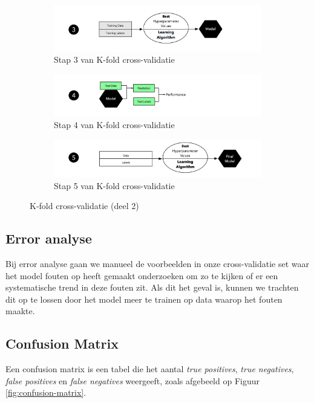 \newpage
\begin{figure}[h]\ContinuedFloat
	\centering
	\begin{subfigure}{.70\textwidth}
		\centering
		\includegraphics[width=\linewidth]{images/23-kfold-step-3.png}
		\caption{Stap 3 van K-fold cross-validatie}
		\label{fig:kfold-step-3}
	\end{subfigure}
	\begin{subfigure}{.70\textwidth}
		\centering
		\includegraphics[width=\linewidth]{images/24-kfold-step-4.png}
		\caption{Stap 4 van K-fold cross-validatie}
		\label{fig:kfold-step-4}
	\end{subfigure}
	\begin{subfigure}{.70\textwidth}
		\centering
		\includegraphics[width=\linewidth]{images/25-kfold-step-5.png}
		\caption{Stap 5 van K-fold cross-validatie}
		\label{fig:kfold-step-5}
	\end{subfigure}
	\caption{K-fold cross-validatie (deel 2)}
\end{figure}

\subsection{Error analyse}

Bij error analyse gaan we manueel de voorbeelden in onze cross-validatie set waar het model fouten op heeft gemaakt onderzoeken om zo te kijken of er een systematische trend in deze fouten zit. Als dit het geval is, kunnen we trachten dit op te lossen door het model meer te trainen op data waarop het fouten maakte.

\subsection{Confusion Matrix}
Een confusion matrix is een tabel die het aantal \textit{true positives}, \textit{true negatives}, \textit{false positives }en \textit{false negatives} weergeeft, zoals afgebeeld op Figuur \ref{fig:confusion-matrix}.

